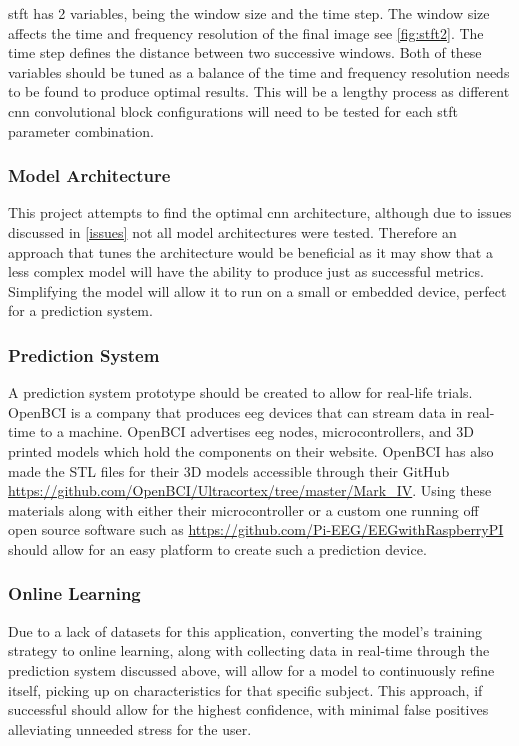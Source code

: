 \documentclass[12pt]{article}
\begin{document}
\acrshort{stft} has 2 variables, being the window size and the time step. The window size affects the time and frequency resolution of the final image see \ref{fig:stft2}. The time step defines the distance between two successive windows. Both of these variables should be tuned as a balance of the time and frequency resolution needs to be found to produce optimal results. This will be a lengthy process as different \acrshort{cnn} convolutional block configurations will need to be tested for each \acrshort{stft} parameter combination.



\subsubsection{Model Architecture}

This project attempts to find the optimal \acrshort{cnn} architecture, although due to issues discussed in \ref{issues} not all model architectures were tested. Therefore an approach that tunes the architecture would be beneficial as it may show that a less complex model will have the ability to produce just as successful metrics. Simplifying the model will allow it to run on a small or embedded device, perfect for a prediction system.


\subsubsection{Prediction System}

A prediction system prototype should be created to allow for real-life trials. OpenBCI is a company that produces \acrshort{eeg} devices that can stream data in real-time to a machine. OpenBCI advertises \acrshort{eeg} nodes, microcontrollers, and 3D printed models which hold the components on their website. OpenBCI has also made the STL files for their 3D models accessible through their GitHub \url{https://github.com/OpenBCI/Ultracortex/tree/master/Mark_IV}. Using these materials along with either their microcontroller or a custom one running off open source software such as \url{https://github.com/Pi-EEG/EEGwithRaspberryPI} should allow for an easy platform to create such a prediction device.


\subsubsection{Online Learning}


Due to a lack of datasets for this application, converting the model's training strategy to online learning, along with collecting data in real-time through the prediction system discussed above, will allow for a model to continuously refine itself, picking up on characteristics for that specific subject. This approach, if successful should allow for the highest confidence, with minimal false positives alleviating unneeded stress for the user.
\end{document}
